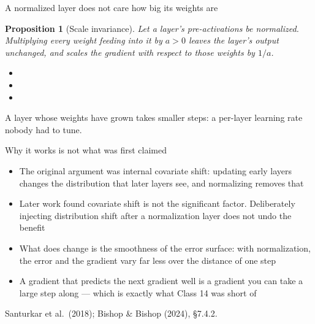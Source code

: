 \documentclass[aspectratio=169, 11pt]{beamer}
\newtheorem{propx}[theorem]{Proposition}
\newcommand{\srcline}[1]{%
  \par\vspace{0.25em}%
  {\scriptsize\color{mcMuted}\hfill #1\par}}
\newcommand{\src}[3]{}      %
\begin{document}
\begin{frame}{A normalized layer does not care how big its weights are}
  \src{ioffe2015}{section}{3.3}
  \vspace{-0.25em}
  \begin{propx}[Scale invariance]\label{th:scaleinv}
    \small
    Let a layer's pre-activations be normalized. Multiplying every
    weight feeding into it by $a > 0$ leaves the layer's output
    unchanged, and scales the gradient with respect to those weights by
    $1/a$.
  \end{propx}
  \vspace{0.05em}
  {\footnotesize
  \begin{itemize}\itemsep0.26em
    \item {}
    \item {}
    \item {}
  \end{itemize}}
  \vspace{-0.7em}
  \begin{redhighlight}
    A layer whose weights have grown takes smaller steps: a per-layer
    learning rate nobody had to tune.
  \end{redhighlight}
\end{frame}

\begin{frame}{Why it works is not what was first claimed}
  \src{santurkar2018}{section}{2.1}
  \src{santurkar2018}{section}{3.1}
  \src{bishop2024}{section}{7.4.2}
  \vspace{0.3em}
  \begin{itemize}\itemsep0.42em
    \item The original argument was \alert{internal covariate shift}:
          updating early layers changes the distribution that later
          layers see, and normalizing removes that
    \item Later work found covariate shift is not the significant
          factor. Deliberately injecting distribution shift after a
          normalization layer does not undo the benefit
    \item What does change is the \alert{smoothness} of the error
          surface: with normalization, the error and the gradient vary
          far less over the distance of one step
    \item A gradient that predicts the next gradient well is a gradient
          you can take a large step along --- which is exactly what
          Class 14 was short of
  \end{itemize}
  \srcline{Santurkar et al.~(2018); Bishop \& Bishop (2024), \S7.4.2.}
\end{frame}
\end{document}
